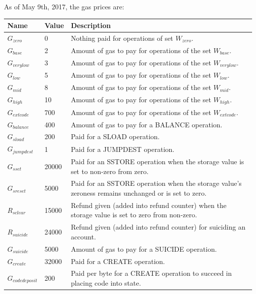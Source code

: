 \documentclass{article}
\begin{document}
		As of May 9th, 2017, the gas prices are\cite{yellow-paper}:
		\begin{table}[h!]
		\footnotesize
		\noindent \begin{tabular}{| l | l | p{8cm} |}
			\hline
			Name 				& Value 	& Description \\ \hline
			$G_{zero}$ 			& 0 		& Nothing paid for operations of set $W_{zero}$. \\ \hline
			$G_{base}$ 			& 2 		& Amount of gas to pay for operations of the set $W_{base}$. \\ \hline
			$G_{verylow}$ 		& 3 		& Amount of gas to pay for operations of the set $W_{verylow}$. \\ \hline
			$G_{low}$ 			& 5 		& Amount of gas to pay for operations of the set $W_{low}$. \\ \hline
			$G_{mid}$ 			& 8 		& Amount of gas to pay for operations of the set $W_{mid}$. \\ \hline
			$G_{high}$ 			& 10 		& Amount of gas to pay for operations of the set $W_{high}$. \\ \hline
			$G_{extcode}$ 		& 700 		& Amount of gas to pay for operations of the set $W_{extcode}$. \\ \hline
			$G_{balance}$ 		& 400 		& Amount of gas to pay for a BALANCE operation. \\ \hline
			$G_{sload}$ 		& 200 		& Paid for a SLOAD operation. \\ \hline
			$G_{jumpdest}$ 		& 1 		& Paid for a JUMPDEST operation. \\ \hline
			$G_{sset}$ 			& 20000 	& Paid for an SSTORE operation when the storage value is set to non-zero from zero. \\ \hline
			$G_{sreset}$ 		& 5000 		& Paid for an SSTORE operation when the storage value's zeroness remains unchanged or is set to zero. \\ \hline
			$R_{sclear}$ 		& 15000		& Refund given (added into refund counter) when the storage value is set to zero from non-zero. \\ \hline
			$R_{suicide}$ 		& 24000 	& Refund given (added into refund counter) for suiciding an account. \\ \hline
			$G_{suicide}$ 		& 5000 		& Amount of gas to pay for a SUICIDE operation. \\ \hline
			$G_{create}$ 		& 32000		& Paid for a CREATE operation. \\ \hline
			$G_{codedeposit}$ 	& 200 		& Paid per byte for a CREATE operation to succeed in placing code into state. \\ \hline

\end{tabular}
\end{table}
\end{document}
